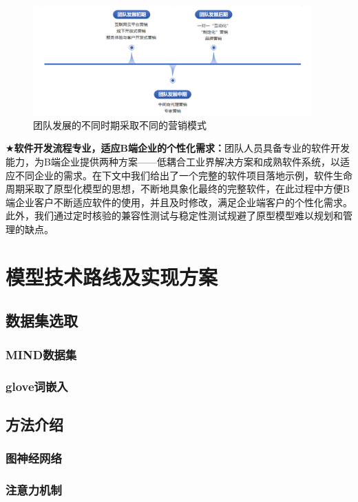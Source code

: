\documentclass[withoutpreface,bwprint]{cumcmthesis} %
\begin{document}
	\begin{figure}[H]
		\includegraphics[width=0.95\textwidth]{营销发展}
		\caption{团队发展的不同时期采取不同的营销模式}
		\label{fig:circuit-diagcam}
	\end{figure}
	$\bigstar$\textbf{软件开发流程专业，适应B端企业的个性化需求：}团队人员具备专业的软件开发能力，为B端企业提供两种方案——低耦合工业界解决方案和成熟软件系统，以适应不同企业的需求。在下文中我们给出了一个完整的软件项目落地示例，软件生命周期采取了原型化模型的思想，不断地具象化最终的完整软件，在此过程中方便B端企业客户不断适应软件的使用，并且及时修改，满足企业端客户的个性化需求。此外，我们通过定时核验的兼容性测试与稳定性测试规避了原型模型难以规划和管理的缺点。\par
	\newpage
	\section{模型技术路线及实现方案}
	\subsection{数据集选取}
	\subsubsection{ MIND数据集}
	\subsubsection{ glove词嵌入}
	\subsection{方法介绍}
	\subsubsection{ 图神经网络}
	\subsubsection{ 注意力机制}
\end{document}

